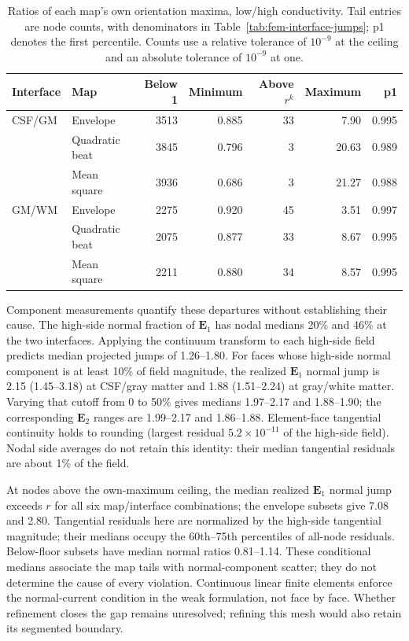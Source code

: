 \begin{table}[htbp]
\centering\small
\begin{tabular}{@{}llrrrrr@{}}
\toprule
Interface & Map & Below 1 & Minimum & Above $r^k$ & Maximum & p1\\
\midrule
CSF/GM & Envelope & 3513 & 0.885 & 33 & 7.90 & 0.995\\
 & Quadratic beat & 3845 & 0.796 & 3 & 20.63 & 0.989\\
 & Mean square & 3936 & 0.686 & 3 & 21.27 & 0.988\\
GM/WM & Envelope & 2275 & 0.920 & 45 & 3.51 & 0.997\\
 & Quadratic beat & 2075 & 0.877 & 33 & 8.67 & 0.995\\
 & Mean square & 2211 & 0.880 & 34 & 8.57 & 0.995\\
\bottomrule
\end{tabular}
\caption{Ratios of each map's own orientation maxima, low/high conductivity.
Tail entries are node counts, with denominators in Table~\ref{tab:fem-interface-jumps};
p1 denotes the first percentile. Counts use a relative tolerance of $10^{-9}$
at the ceiling and an absolute tolerance of $10^{-9}$ at one.}
\label{tab:fem-interface-tails}
\end{table}

Component measurements quantify these departures without establishing their
cause. The high-side normal fraction of $\mathbf E_1$ has nodal medians
20\% and 46\% at the two interfaces. Applying the continuum transform to
each high-side field predicts median projected jumps of 1.26--1.80.
For faces whose high-side normal component is at least 10\% of field magnitude,
the realized $\mathbf E_1$ normal jump is 2.15 (1.45--3.18) at CSF/gray matter
and 1.88 (1.51--2.24) at gray/white matter. Varying that cutoff from 0 to 50\%
gives medians 1.97--2.17 and 1.88--1.90; the corresponding $\mathbf E_2$
ranges are 1.99--2.17 and 1.86--1.88. Element-face tangential continuity holds
to rounding (largest residual $5.2\times10^{-11}$ of the high-side field).
Nodal side averages do not retain this identity: their median tangential
residuals are about 1\% of the field.

At nodes above the own-maximum ceiling, the median realized $\mathbf E_1$
normal jump exceeds $r$ for all six map/interface combinations; the envelope
subsets give 7.08 and 2.80. Tangential residuals here are normalized by the
high-side tangential magnitude; their medians occupy the 60th--75th
percentiles of all-node residuals. Below-floor subsets have median normal
ratios 0.81--1.14. These conditional medians associate the map tails with
normal-component scatter; they do not determine the cause of every violation.
Continuous linear finite elements enforce the normal-current condition in
the weak formulation, not face by face. Whether refinement closes the gap
remains unresolved; refining this mesh would also retain its segmented boundary.

